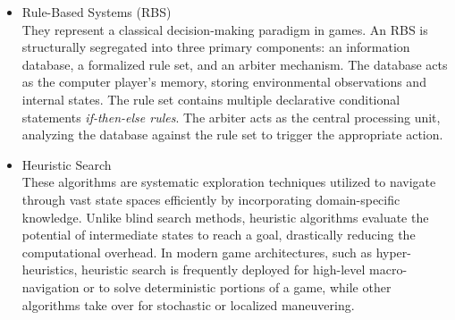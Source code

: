 \begin{itemize}
\begin{enumerate}
		\item The root node of BT generates execution \textit{tick}.
		\item The root node passes the tick signal downward to its child nodes, sequentially from left to right.
		\item The signal cascades through the intermediate nodes until it reaches a leaf node, which is responsible for a certain action.
		\item The leaf node evaluates its own progress. 
		The resulting status is passed back up to the parent composite node.
		\\If the parent is a Selector, and it receives a Failure, it sends a new tick to its next available child.
		\\If the parent is a Sequence, and it receives a Success, it sends a new tick to its next available child.
		\\If any parent receives a Running status, all lateral traversal stops instantly, and the Running status is pushed all the way back up to the root, effectively locking the tree's focus onto that ongoing action for the current frame.
	\end{enumerate}
	\item Rule-Based Systems (RBS) \\ They represent a classical decision-making paradigm in games. An RBS is structurally segregated into three primary components: an information database, a formalized rule set, and an arbiter mechanism. The database acts as the computer player's memory, storing environmental observations and internal states. The rule set contains multiple declarative conditional statements \textit{if-then-else rules}. The arbiter acts as the central processing unit, analyzing the database against the rule set to trigger the appropriate action. \cite{uludagli2023non}
	
	\item Heuristic Search \\These algorithms are systematic exploration techniques utilized to navigate through vast state spaces efficiently by incorporating domain-specific knowledge. Unlike blind search methods, heuristic algorithms evaluate the potential of intermediate states to reach a goal, drastically reducing the computational overhead. In modern game architectures, such as hyper-heuristics, heuristic search is frequently deployed for high-level macro-navigation or to solve deterministic portions of a game, while other algorithms take over for stochastic or localized maneuvering. \cite{perez2019general}
	

\end{itemize}

